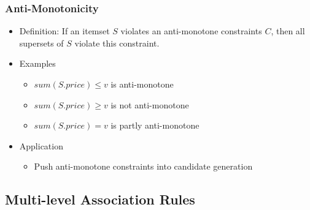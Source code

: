\documentclass{article}
\begin{document}
\subsubsection{Anti-Monotonicity}
\begin{itemize}
  \item Definition: If an itemset $S$ violates an anti-monotone constraints $C$, then all supersets of $S$ violate this constraint.
  \item Examples
    \begin{itemize}
      \item $sum(S.price) \le v$ is anti-monotone
      \item $sum(S.price) \ge v$ is not anti-monotone
      \item $sum(S.price) = v$ is partly anti-monotone
    \end{itemize}
  \item Application
    \begin{itemize}
      \item Push anti-monotone constraints into candidate generation
    \end{itemize}
\end{itemize} 

\subsection{Multi-level Association Rules}
\end{document}
